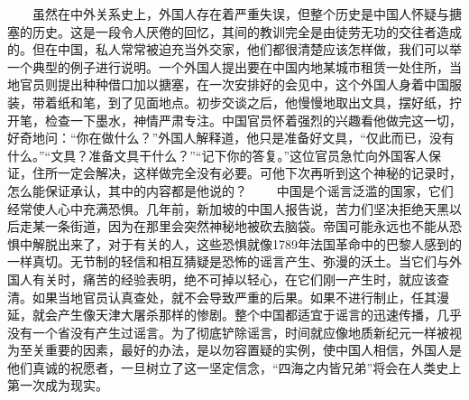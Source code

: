\documentclass[12pt,oneside]{book}
\begin{document}
\begin{common-format}
　　虽然在中外关系史上，外国人存在着严重失误，但整个历史是中国人怀疑与搪塞的历史。这是一段令人厌倦的回忆，其间的教训完全是由徒劳无功的交往者造成的。但在中国，私人常常被迫充当外交家，他们都很清楚应该怎样做，我们可以举一个典型的例子进行说明。一个外国人提出要在中国内地某城市租赁一处住所，当地官员则提出种种借口加以搪塞，在一次安排好的会见中，这个外国人身着中国服装，带着纸和笔，到了见面地点。初步交谈之后，他慢慢地取出文具，摆好纸，拧开笔，检查一下墨水，神情严肃专注。中国官员怀着强烈的兴趣看他做完这一切，好奇地问：“你在做什么？”外国人解释道，他只是准备好文具，“仅此而已，没有什么。”“文具？准备文具干什么？”“记下你的答复。”这位官员急忙向外国客人保证，住所一定会解决，这样做完全没有必要。可他下次再听到这个神秘的记录时，怎么能保证承认，其中的内容都是他说的？ 
　　中国是个谣言泛滥的国家，它们经常使人心中充满恐惧。几年前，新加坡的中国人报告说，苦力们坚决拒绝天黑以后走某一条街道，因为在那里会突然神秘地被砍去脑袋。帝国可能永远也不能从恐惧中解脱出来了，对于有关的人，这些恐惧就像1789年法国革命中的巴黎人感到的一样真切。无节制的轻信和相互猜疑是恐怖的谣言产生、弥漫的沃土。当它们与外国人有关时，痛苦的经验表明，绝不可掉以轻心，在它们刚一产生时，就应该查清。如果当地官员认真查处，就不会导致严重的后果。如果不进行制止，任其漫延，就会产生像天津大屠杀那样的惨剧。整个中国都适宜于谣言的迅速传播，几乎没有一个省没有产生过谣言。为了彻底铲除谣言，时间就应像地质新纪元一样被视为至关重要的因素，最好的办法，是以勿容置疑的实例，使中国人相信，外国人是他们真诚的祝愿者，一旦树立了这一坚定信念，“四海之内皆兄弟”将会在人类史上第一次成为现实。



\end{common-format}
\end{document}
